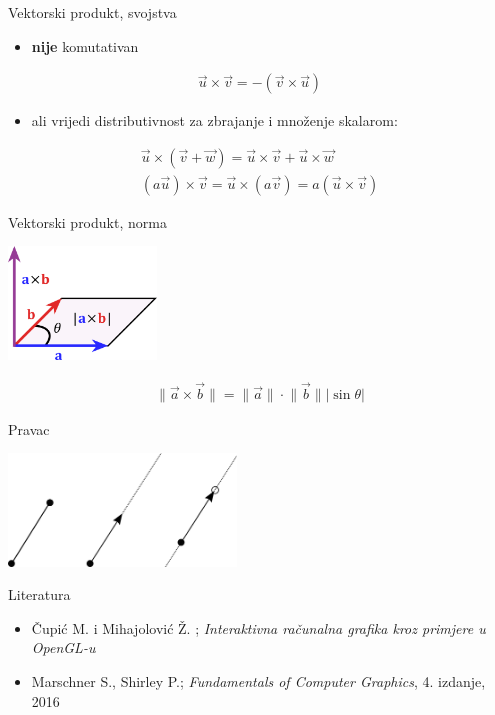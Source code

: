 \documentclass[9pt]{beamer}
\begin{document}
\begin{frame}{Vektorski produkt, svojstva}
	\begin{itemize}
		\item \textbf{nije} komutativan
	\end{itemize}
	\begin{align*}
	\vec{u} \times \vec{v} = -(\vec{v} \times \vec{u})
	\end{align*}
	\begin{itemize}
		\item ali vrijedi distributivnost za zbrajanje i množenje skalarom:
	\end{itemize}
	\begin{align*}
		\vec{u} \times (\vec{v} + \vec{w}) = \vec{u} \times \vec{v} + \vec{u} \times \vec{w} \\
		(a\vec{u}) \times \vec{v} = \vec{u} \times (a\vec{v}) = a (\vec{u} \times \vec{v})
	\end{align*}
\end{frame}

\begin{frame}{Vektorski produkt, norma}
	\begin{center}
		\includegraphics[height=3cm]{./slike/linear_algebra_cross_product_wiki.png}
	\end{center}

	\begin{align*}
	\lVert \vec{a} \times \vec{b} \rVert = \lVert \vec{a} \rVert \cdot \lVert \vec{b} \rVert |\sin \theta|
	\end{align*}
\end{frame}	

\begin{frame}{Pravac}
	\begin{center}
		\includegraphics[height=3cm]{./slike/linear_algebra_pravci.png}
	\end{center}
\end{frame}
\begin{frame}{Literatura}
	\begin{itemize}
		\item Čupić M. i Mihajolović Ž. ; \textit{Interaktivna računalna grafika kroz primjere u OpenGL-u}
		\item Marschner S., Shirley P.; \textit{Fundamentals of Computer Graphics}, 4. izdanje, 2016
	\end{itemize}
\end{frame}
\end{document}
